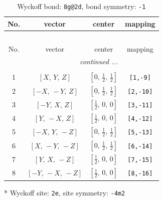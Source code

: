 \documentclass[fleqn,8pt]{jsarticle}
\begin{document}
\renewcommand{\arraystretch}{1.2}
\begin{longtable}{cccc}
\caption{Wyckoff bond: {\tt 8g@2d}, bond symmetry: {\tt -1}}
 \\
 \hline \hline
No. & vector & center & mapping \\ \hline \endfirsthead

\multicolumn{3}{l}{\tablename\ \thetable{}} \\
 \hline \hline
No. & vector & center & mapping \\ \hline \endhead

 \hline \hline
\multicolumn{3}{r}{\footnotesize\it continued ...} \\ \endfoot

 \hline \hline
\multicolumn{3}{r}{} \\ \endlastfoot

1 & $\left[ X,\, Y,\, Z \right]$ & $\left[ 0,\, \frac{1}{2},\, \frac{1}{2} \right]$ & {\tt [1,-9]} \\ \hline
2 & $\left[ - X,\, - Y,\, Z \right]$ & $\left[ 0,\, \frac{1}{2},\, \frac{1}{2} \right]$ & {\tt [2,-10]} \\ \hline
3 & $\left[ - Y,\, X,\, Z \right]$ & $\left[ \frac{1}{2},\, 0,\, 0 \right]$ & {\tt [3,-11]} \\ \hline
4 & $\left[ Y,\, - X,\, Z \right]$ & $\left[ \frac{1}{2},\, 0,\, 0 \right]$ & {\tt [4,-12]} \\ \hline
5 & $\left[ - X,\, Y,\, - Z \right]$ & $\left[ 0,\, \frac{1}{2},\, \frac{1}{2} \right]$ & {\tt [5,-13]} \\ \hline
6 & $\left[ X,\, - Y,\, - Z \right]$ & $\left[ 0,\, \frac{1}{2},\, \frac{1}{2} \right]$ & {\tt [6,-14]} \\ \hline
7 & $\left[ Y,\, X,\, - Z \right]$ & $\left[ \frac{1}{2},\, 0,\, 0 \right]$ & {\tt [7,-15]} \\ \hline
8 & $\left[ - Y,\, - X,\, - Z \right]$ & $\left[ \frac{1}{2},\, 0,\, 0 \right]$ & {\tt [8,-16]} \\
\end{longtable}
* Wyckoff site: {\tt 2e}, site symmetry: {\tt -4m2}
\renewcommand{\arraystretch}{1.2}
\end{document}
